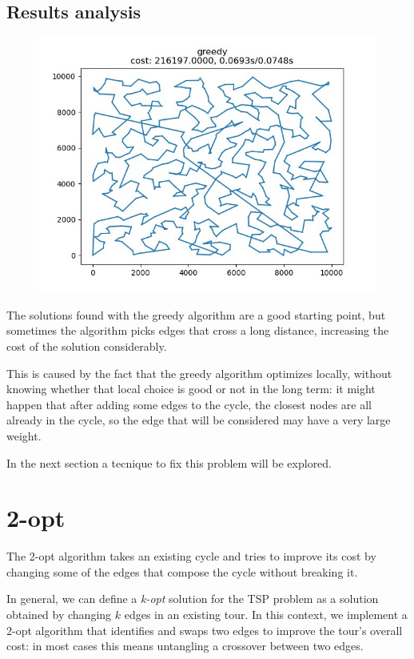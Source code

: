 \subsection{Results analysis}
\begin{figure}[h]
    \centering
    \includegraphics*[width=.6\textwidth]{../code/solutions/1_600_greedy.jpg}
\end{figure}

The solutions found with the greedy algorithm are a good starting point, but sometimes the algorithm picks edges that cross a long distance, increasing the cost of the solution considerably.

This is caused by the fact that the greedy algorithm optimizes locally, without knowing whether that local choice is good or not in the long term: it might happen that after adding some edges to the cycle, the closest nodes are all already in the cycle, so the edge that will be considered may have a very large weight.

In the next section a tecnique to fix this problem will be explored.

\newpage

\section{2-opt}

The 2-opt algorithm \cite{Croes1958AMF} takes an existing cycle and tries to improve its cost by changing some of the edges that compose the cycle without breaking it.

In general, we can define a \textit{k-opt} solution for the TSP problem as a solution obtained by changing $k$ edges in an existing tour. In this context, we implement a 2-opt algorithm that identifies and swaps two edges to improve the tour's overall cost: in most cases this means untangling a crossover between two edges.

